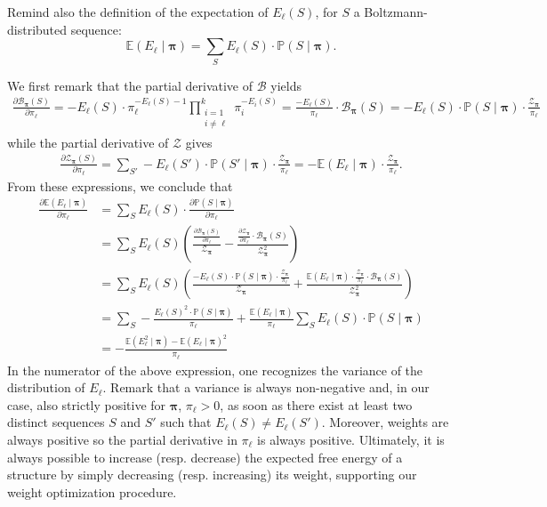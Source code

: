 \documentclass{bioinfo}
\newcommand{\partfun}[1]{\mathcal{Z}_{#1}}
\begin{document}
Remind also the definition of the expectation of $E_\ell(S)$, for $S$ a Boltzmann-distributed sequence:
$$\mathbb{E}(E_\ell\mid \pmb{\pi}) = \sum_S E_\ell(S)\cdot \mathbb{P}(S\mid \pmb{\pi}).$$

We first remark that the partial derivative of $\mathcal{B}$ yields
\begin{align*}
  \frac{\partial \mathcal{B}_{\pmb{\pi}}(S)}{\partial \pi_\ell} = -E_\ell(S)\cdot \pi_\ell^{-E_\ell(S)-1}\prod_{\substack{i=1\\i\neq \ell}}^{k} \pi_i^{-E_i(S)} = \frac{-E_\ell(S)}{\pi_\ell}\cdot\mathcal{B}_{\pmb{\pi}}(S) = -E_\ell(S)\cdot \mathbb{P}(S\mid \pmb{\pi})\cdot \frac{\partfun{\pmb{\pi}}}{\pi_\ell }
\end{align*}
while the partial derivative of $\mathcal{Z}$ gives
\begin{align*}
  \frac{\partial \partfun{\pmb{\pi}}(S)}{\partial \pi_\ell} = \sum_{S'} -E_\ell(S')\cdot \mathbb{P}(S'\mid \pmb{\pi})\cdot \frac{\partfun{\pmb{\pi}}}{\pi_\ell }= -\mathbb{E}(E_\ell\mid \pmb{\pi})\cdot \frac{\partfun{\pmb{\pi}}}{\pi_\ell}.
\end{align*}
From these expressions, we conclude that
\begin{align*}
  \frac{\partial \mathbb{E}(E_\ell\mid \pmb{\pi})}{\partial \pi_\ell} &= \sum_S E_\ell(S)\cdot\frac{\partial \mathbb{P}(S\mid \pmb{\pi})}{\partial \pi_\ell}\\
  & = \sum_S E_\ell(S)\left(\frac{\frac{\partial \mathcal{B}_{\pmb{\pi}}(S)}{\partial \pi_\ell}}{\mathcal{Z}_{\pmb{\pi}}} - \frac{\frac{\partial \mathcal{Z}_{\pmb{\pi}}}{\partial \pi_\ell}\cdot\mathcal{B}_{\pmb{\pi}}(S)}{\mathcal{Z}_{\pmb{\pi}}^2}\right)\\
  & = \sum_S E_\ell(S)\left(\frac{-E_\ell(S)\cdot \mathbb{P}(S\mid \pmb{\pi})\cdot \frac{\mathcal{Z}_{\pmb{\pi}}}{\pi_\ell }}{\mathcal{Z}_{\pmb{\pi}}} + \frac{\mathbb{E}(E_\ell\mid \pmb{\pi})\cdot \frac{\mathcal{Z}_{\pmb{\pi}}}{\pi_\ell}\cdot\mathcal{B}_{\pmb{\pi}}(S)}{\mathcal{Z}_{\pmb{\pi}}^2}\right)\\
  & = \sum_S - \frac{E_\ell(S)^2\cdot\mathbb{P}(S\mid \pmb{\pi})}{\pi_\ell} + \frac{\mathbb{E}(E_\ell\mid \pmb{\pi})}{\pi_\ell}\sum_S E_\ell(S)\cdot \mathbb{P}(S\mid \pmb{\pi})\\
  & = -\frac{\mathbb{E}(E_\ell^2\mid \pmb{\pi}) - \mathbb{E}(E_\ell\mid \pmb{\pi})^2}{\pi_\ell}
\end{align*}
In the numerator of the above expression, one recognizes the variance of the distribution of $E_\ell$.
Remark that a variance is always non-negative and, in our case, also strictly positive for $\pmb{\pi}$, $\pi_\ell>0$, as soon as there exist at least two distinct sequences $S$ and $S'$ such that $E_\ell(S)\neq E_\ell(S')$.
Moreover, weights are always positive so the partial derivative in $\pi_\ell$ is always positive. Ultimately, it is always possible to increase (resp. decrease) the expected free energy of a structure by simply decreasing (resp. increasing) its weight, supporting our weight optimization procedure.
\newpage
\end{document}
